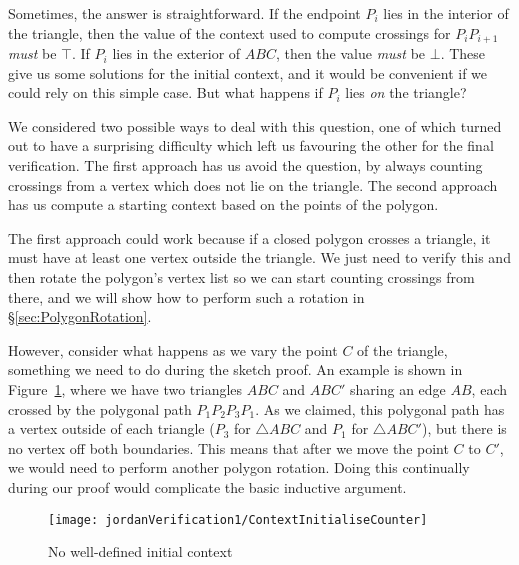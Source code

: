 Sometimes, the answer is straightforward. If the endpoint $P_i$ lies in the interior of the triangle, then the value of the context used to compute crossings for $P_iP_{i+1}$ \emph{must} be $\top$. If $P_i$ lies in the exterior of $ABC$, then the value \emph{must} be $\bot$. These give us some solutions for the initial context, and it would be convenient if we could rely on this simple case. But what happens if $P_i$ lies \emph{on} the triangle?

We considered two possible ways to deal with this question, one of which turned out to have a surprising difficulty which left us favouring the other for the final verification. The first approach has us avoid the question, by always counting crossings from a vertex which does not lie on the triangle. The second approach has us compute a starting context based on the points of the polygon.

The first approach could work because if a closed polygon crosses a triangle, it must have at least one vertex outside the triangle. We just need to verify this and then rotate the polygon's vertex list so we can start counting crossings from there, and we will show how to perform such a rotation in \S\ref{sec:PolygonRotation}.

However, consider what happens as we vary the point $C$ of the triangle, something we need to do during the sketch proof. An example is shown in Figure~\ref{fig:ContextInitialiseCounter}, where we have two triangles $ABC$ and $ABC'$ sharing an edge $AB$, each crossed by the polygonal path $P_1P_2P_3P_1$. As we claimed, this polygonal path has a vertex outside of each triangle ($P_3$ for $\triangle ABC$ and $P_1$ for $\triangle ABC'$), but there is no vertex off both boundaries. This means that after we move the point $C$ to $C'$, we would need to perform another polygon rotation. Doing this continually during our proof would complicate the basic inductive argument.

\begin{figure}
\centering\texttt{[image: jordanVerification1/ContextInitialiseCounter]}
\caption{No well-defined initial context}
\label{fig:ContextInitialiseCounter}
\end{figure}

